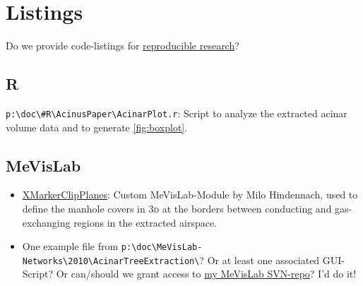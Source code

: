 \documentclass[%
	draft=false,
	paper=a4,%
	twoside=true,%
	draft=false,%
	abstract=false]{scrartcl}
\newcommand{\threed}{3\textsc{d}\xspace}
\begin{document}



\appendix
\section{Listings}
Do we provide code-listings for \href{http://reproducibleresearch.net}{reproducible research}?
\subsection{R}
\verb+p:\doc\#R\AcinusPaper\AcinarPlot.r+: Script to analyze the extracted acinar volume data and to generate \autoref{fig:boxplot}.

\subsection{MeVisLab}
\begin{itemize}
	\item \href{http://www.mevis-research.de/cgi-bin/discus/board-auth.cgi?lm=1282233250&file=/839/11760.html}{XMarkerClipPlanes}: Custom MeVisLab-Module by Milo Hindennach, used to define the manhole covers in \threed at the borders between conducting and gas-exchanging regions in the extracted airspace.
	\item One example file from \verb+p:\doc\MeVisLab-Networks\2010\AcinarTreeExtraction\+? Or at least one associated GUI-Script? Or can/should we grant access to \href{http://is.gd/n24V7g}{my MeVisLab SVN-repo}? I’d do it!
\end{itemize}
 
\end{document}
